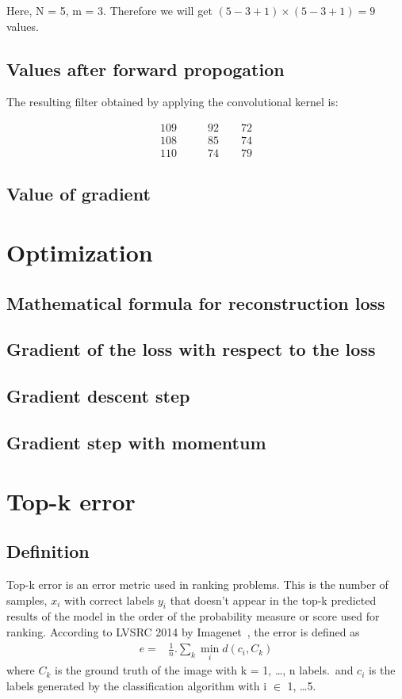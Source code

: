 \documentclass{article}
\begin{document}
Here, N = 5, m = 3.
Therefore we will get $(5-3+1) \times (5-3+1) = 9$ values.
\subsection{Values after forward propogation}
The resulting filter obtained by applying the convolutional kernel is:
\begin{centering}
  \begin{align*}
  109 &\qquad 92 \qquad 72 \\
  108 &\qquad 85 \qquad 74 \\
  110 &\qquad 74 \qquad 79
  \end{align*}
\end{centering}

\subsection{Value of gradient}

\section{Optimization}
\subsection{Mathematical formula for reconstruction loss}
\subsection{Gradient of the loss with respect to the loss}
\subsection{Gradient descent step}
\subsection{Gradient step with momentum}

\section{Top-k error}
\subsection{Definition}
Top-k error is an error metric used in ranking problems.  
This is the number of samples, $x_{i}$ with correct labels $ y_{i} $ that doesn't appear in the top-k predicted results of the model in the order of the probability measure or score used for ranking.  
According to LVSRC 2014 by Imagenet~\cite{ILSVRC15}, the error is defined as
\begin{align*}
  e =& \frac{1}{n}. \sum_{k} \min_{i} d(c_{i}, C_{k})
\end{align*}
where $C_{k}$ is the ground truth of the image with k = 1, \ldots, n labels.\ 
and $c_{i}$ is the labels generated by the classification algorithm with i $\in$ 1, \ldots 5.
\end{document}
